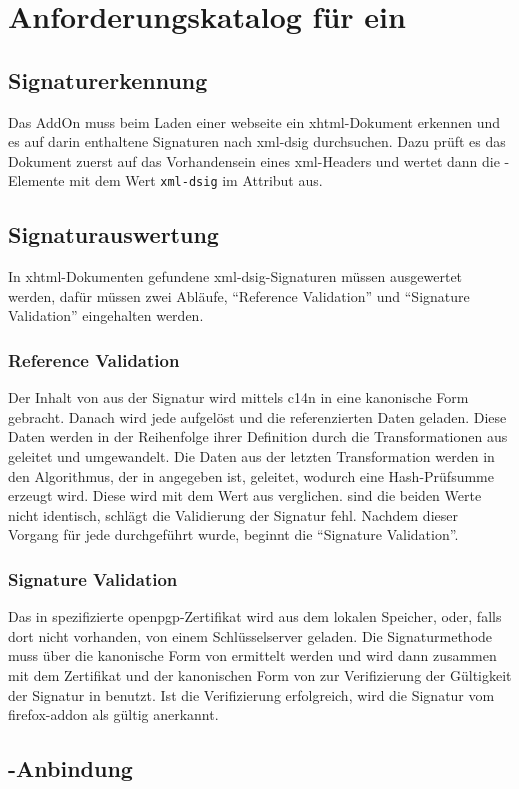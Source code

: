 
\chapter{Anforderungskatalog für ein \protect{}}
\label{chap:Anforderungskatalog}

\section{Signaturerkennung}
\label{sec:Anforderungskatalog:Signaturerkennung}
Das AddOn muss beim Laden einer \gls{webseite} ein \gls{xhtml}-Dokument erkennen und es auf darin enthaltene Signaturen nach \gls{xml-dsig}
durchsuchen. Dazu prüft es das Dokument zuerst auf das Vorhandensein eines \gls{xml}-Headers und wertet dann die -Elemente mit dem Wert
\texttt{xml-dsig} im Attribut  aus.

\section{Signaturauswertung}
\label{sec:Anforderungskatalog:Signaturauswertung}
In \gls{xhtml}-Dokumenten gefundene \gls{xml-dsig}-Signaturen müssen ausgewertet werden, dafür müssen zwei Abläufe, "`Reference Validation"' und "`Signature
Validation"' eingehalten werden.

\subsection{Reference Validation}
Der Inhalt von  aus der Signatur wird mittels \gls{c14n} in eine kanonische Form gebracht. Danach wird jede  aufgelöst
und die referenzierten Daten geladen. Diese Daten werden in der Reihenfolge ihrer Definition durch die Transformationen aus  geleitet und
umgewandelt. Die Daten aus der letzten Transformation werden in den Algorithmus, der in  angegeben ist, geleitet, wodurch eine
Hash-Prüfsumme erzeugt wird. Diese wird mit dem Wert aus  verglichen. sind die beiden Werte nicht identisch, schlägt die Validierung der
Signatur fehl. Nachdem dieser Vorgang für jede  durchgeführt wurde, beginnt die "`Signature Validation"'.

\subsection{Signature Validation}
Das in  spezifizierte \gls{openpgp}-Zertifikat wird aus dem lokalen Speicher, oder, falls dort nicht vorhanden, von einem Schlüsselserver
geladen. Die Signaturmethode muss über die kanonische Form von  ermittelt werden und wird dann zusammen mit dem Zertifikat und der
kanonischen Form von  zur Verifizierung der Gültigkeit der Signatur in  benutzt. Ist die Verifizierung erfolgreich,
wird die Signatur vom \gls{firefox-addon} als gültig anerkannt.

\section{\protect{}-Anbindung}
\label{sec:Anforderungskatalog:GnuPG-Anbindung}

